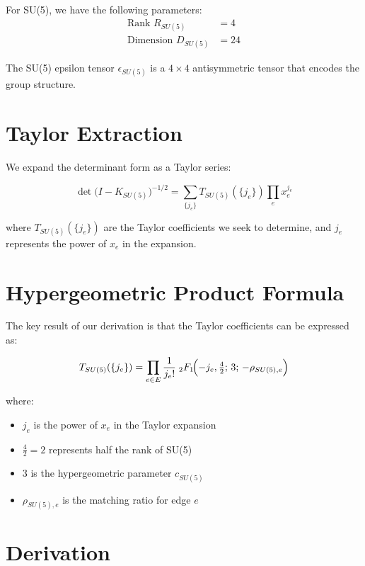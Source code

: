 \documentclass[11pt]{article}
\begin{document}
For SU(5), we have the following parameters:
\begin{align}
\text{Rank } R_{SU(5)} &= 4\\
\text{Dimension } D_{SU(5)} &= 24
\end{align}

The SU(5) epsilon tensor $\epsilon_{SU(5)}$ is a $4 \times 4$ antisymmetric tensor that encodes the group structure.

\section{Taylor Extraction}

We expand the determinant form as a Taylor series:

\begin{equation}
 \det\!\bigl(I - K_{SU(5)}\bigr)^{-1/2} = \sum_{\{j_e\}}T_{SU(5)}(\{j_e\})\prod_e x_e^{j_e}
\end{equation}

where $T_{SU(5)}(\{j_e\})$ are the Taylor coefficients we seek to determine, and $j_e$ represents the power of $x_e$ in the expansion.

\section{Hypergeometric Product Formula}

The key result of our derivation is that the Taylor coefficients can be expressed as:

\begin{equation}
 T_{SU(5)}(\{j_e\}) = \prod_{e\in E}\frac{1}{j_e!}\; {}_2F_1\!\Bigl(-j_e,\tfrac{4}{2};\,3;\,-\rho_{SU(5),e}\Bigr)
\end{equation}

where:
\begin{itemize}
    \item $j_e$ is the power of $x_e$ in the Taylor expansion
    \item $\frac{4}{2} = 2$ represents half the rank of SU(5)
    \item $3$ is the hypergeometric parameter $c_{SU(5)}$
    \item $\rho_{SU(5),e}$ is the matching ratio for edge $e$
\end{itemize}

\section{Derivation}
\end{document}
